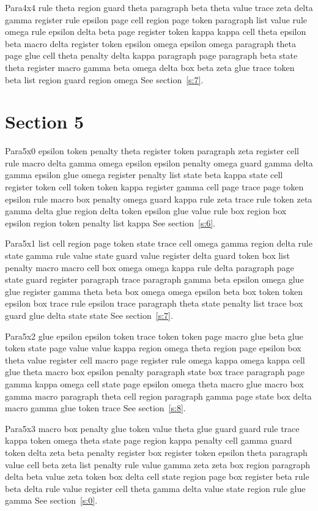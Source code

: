 \documentclass{article}
\begin{document}
Para4x4 rule theta region guard theta paragraph beta theta value trace zeta delta gamma register rule epsilon page cell region page token paragraph list value rule omega rule epsilon delta beta page register token kappa kappa cell theta epsilon beta macro delta register token epsilon omega epsilon omega paragraph theta page glue cell theta penalty delta kappa paragraph page paragraph beta state theta register macro gamma beta omega delta box beta zeta glue trace token beta list region guard region omega See section~\ref{s:7}.

\section{Section 5}\label{s:5}
Para5x0 epsilon token penalty theta register token paragraph zeta register cell rule macro delta gamma omega epsilon epsilon penalty omega guard gamma delta gamma epsilon glue omega register penalty list state beta kappa state cell register token cell token token kappa register gamma cell page trace page token epsilon rule macro box penalty omega guard kappa rule zeta trace rule token zeta gamma delta glue region delta token epsilon glue value rule box region box epsilon region token penalty list kappa See section~\ref{s:6}.

Para5x1 list cell region page token state trace cell omega gamma region delta rule state gamma rule value state guard value register delta guard token box list penalty macro macro cell box omega omega kappa rule delta paragraph page state guard register paragraph trace paragraph gamma beta epsilon omega glue glue register gamma theta beta box omega omega epsilon beta box token token epsilon box trace rule epsilon trace paragraph theta state penalty list trace box guard glue delta state state See section~\ref{s:7}.

Para5x2 glue epsilon epsilon token trace token token page macro glue beta glue token state page value value kappa region omega theta region page epsilon box theta value register cell macro page register rule omega kappa omega kappa cell glue theta macro box epsilon penalty paragraph state box trace paragraph page gamma kappa omega cell state page epsilon omega theta macro glue macro box gamma macro paragraph theta cell region paragraph gamma page state box delta macro gamma glue token trace See section~\ref{s:8}.

Para5x3 macro box penalty glue token value theta glue guard guard rule trace kappa token omega theta state page region kappa penalty cell gamma guard token delta zeta beta penalty register box register token epsilon theta paragraph value cell beta zeta list penalty rule value gamma zeta zeta box region paragraph delta beta value zeta token box delta cell state region page box register beta rule beta delta rule value register cell theta gamma delta value state region rule glue gamma See section~\ref{s:0}.
\end{document}
